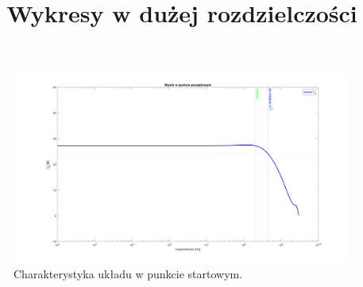 \documentclass{article}
\begin{document}
\pagebreak
\begin{center}
	\title{ \huge \textbf{Wykresy w dużej rozdzielczości}}
\end{center}

\begin{landscape}
	\begin{figure}[h]
		\vspace*{-2cm}
		\includegraphics[width=25cm,height=15 cm]{graphics/starting_point.png}
		\centering
		\caption{Charakterystyka układu w punkcie startowym.}
	\end{figure}
\end{landscape}
\end{document}
